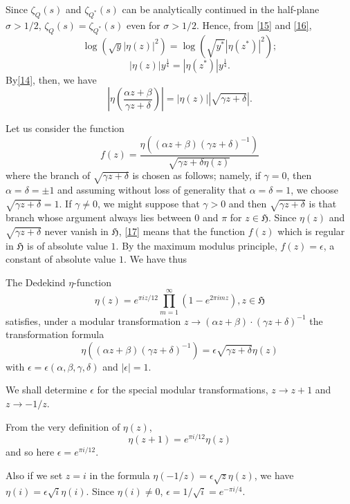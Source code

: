 Since $\zeta_{Q}(s)$ and $\zeta_{Q^{\ast}}(s)$ can be analytically
continued in the half-plane $\sigma>1/2$,
$\zeta_{Q}(s)=\zeta_{Q^{\ast}}(s)$ even for $\sigma>1/2$. Hence, from
\eqref{15} and \eqref{16}, 
$$
\log(\sqrt{y}|\eta(z)|^{2})=\log(\sqrt{y^{\ast}}|\eta(z^{\ast})|^{2});
$$
\ie
$$
|\eta(z)|y^{\frac{1}{4}}=|\eta(z^{\ast})|y^{\frac{1}{4}}.
$$
By\pageoriginale \eqref{14}, then, we have
\begin{equation*}
\left|\eta\left(\frac{\alpha z+\beta}{\gamma
  z+\delta}\right)\right|=|\eta(z)||\sqrt{\gamma
  z+\delta}|.\tag{17}\label{17} 
\end{equation*}

Let us consider the function
$$
f(z)=\frac{\eta((\alpha z+\beta)(\gamma z+\delta)^{-1})}{\sqrt{\gamma
    z+\delta\eta(z)}} 
$$
where the branch of $\sqrt{\gamma z+\delta}$ is chosen as follows;
namely, if $\gamma=0$, then $\alpha=\delta=\pm 1$ and assuming without
loss of generality that $\alpha=\delta=1$, we choose $\sqrt{\gamma
  z+\delta}=1$. If $\gamma\neq 0$, we might suppose that $\gamma>0$
and then $\sqrt{\gamma z+\delta}$ is that branch whose argument always
lies between $0$ and $\pi$ for $z\in\mathfrak{H}$. Since $\eta(z)$ and
$\sqrt{\gamma z+\delta}$ never vanish in $\mathfrak{H}$, \eqref{17}
means that the function $f(z)$ which is regular in $\mathfrak{H}$ is
of absolute value $1$. By the maximum modulus principle,
$f(z)=\epsilon$, a constant of absolute value $1$. We have thus

\begin{proposition}\label{prop3}
The Dedekind $\eta$-function
$$
\eta(z)=e^{\pi iz/12}\prod^{\infty}_{m=1}(1-e^{2\pi imz}), z\in\mathfrak{H}
$$
satisfies, under a modular transformation $z\to(\alpha z+\beta)\cdot
(\gamma z+\delta)^{-1}$ the transformation formula
$$
\eta((\alpha z+\beta)(\gamma z+\delta)^{-1})=\epsilon\sqrt{\gamma
  z+\delta}\eta(z) 
$$
with $\epsilon=\epsilon(\alpha,\beta,\gamma,\delta)$ and $|\epsilon|=1$.
\end{proposition}

We shall determine $\epsilon$ for the special modular transformations,
$z\to z+1$ and $z\to -1/z$.

From the very definition of $\eta(z)$,
\begin{equation*}
\eta(z+1)=e^{\pi i/12}\eta(z)\tag{18}\label{18}
\end{equation*}
and so here $\epsilon=e^{\pi i/12}$.

Also if we set $z=i$ in the formula
$\eta(-1/z)=\epsilon\sqrt{z}\eta(z)$, we have
$\eta(i)=\epsilon\sqrt{i}\eta(i)$. Since $\eta(i)\neq 0$,
$\epsilon=1/\sqrt{i}=e^{-\pi i/4}$. 

